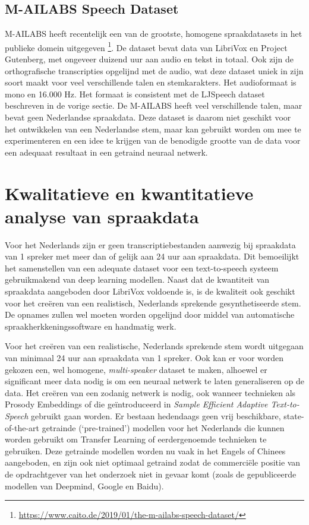 \subsection{M-AILABS Speech Dataset}
M-AILABS heeft recentelijk een van de grootste, homogene spraakdatasets in het publieke domein uitgegeven
\footnote{\url{https://www.caito.de/2019/01/the-m-ailabs-speech-dataset/}}. De dataset bevat data van LibriVox en Project Gutenberg, met ongeveer duizend uur aan audio en tekst in totaal. Ook zijn de orthografische transcripties opgelijnd met de audio, wat deze dataset uniek in zijn soort maakt voor veel verschillende talen en stemkarakters. Het audioformaat is mono en 16.000 Hz. Het formaat is consistent met de LJSpeech dataset beschreven in de vorige sectie. De M-AILABS heeft veel verschillende talen, maar bevat geen Nederlandse spraakdata. Deze dataset is daarom niet geschikt voor het ontwikkelen van een Nederlandse stem, maar kan gebruikt worden om mee te experimenteren en een idee te krijgen van de benodigde grootte van de data voor een adequaat resultaat in een getraind neuraal netwerk.

\section{Kwalitatieve en kwantitatieve analyse van spraakdata}

Voor het Nederlands zijn er geen transcriptiebestanden aanwezig bij spraakdata van 1 spreker met meer dan of gelijk aan 24 uur aan spraakdata. Dit bemoeilijkt het samenstellen van een adequate dataset voor een text-to-speech systeem gebruikmakend van deep learning modellen. Naast dat de kwantiteit van spraakdata aangeboden door LibriVox voldoende is, is de kwaliteit ook geschikt voor het creëren van een realistisch, Nederlands sprekende gesynthetiseerde stem. De opnames zullen wel moeten worden opgelijnd door middel van automatische spraakherkkeningssoftware en handmatig werk.

Voor het creëren van een realistische, Nederlands sprekende stem wordt uitgegaan van minimaal 24 uur aan spraakdata van 1 spreker. Ook kan er voor worden gekozen een, wel homogene, \textit{multi-speaker} dataset te maken, alhoewel er significant meer data nodig is om een neuraal netwerk te laten generaliseren op de data. Het creëren van een zodanig netwerk is nodig, ook wanneer technieken als Prosody Embeddings of die geïntroduceerd in \textit{Sample Efficient Adaptive Text-to-Speech} gebruikt gaan worden. Er bestaan hedendaags geen vrij beschikbare, state-of-the-art getrainde (`pre-trained') modellen voor het Nederlands die kunnen worden gebruikt om Transfer Learning of eerdergenoemde technieken te gebruiken. Deze getrainde modellen worden nu vaak in het Engels of Chinees aangeboden, en zijn ook niet optimaal getraind zodat de commerciële positie van de opdrachtgever van het onderzoek niet in gevaar komt (zoals de gepubliceerde modellen van Deepmind, Google en Baidu).

